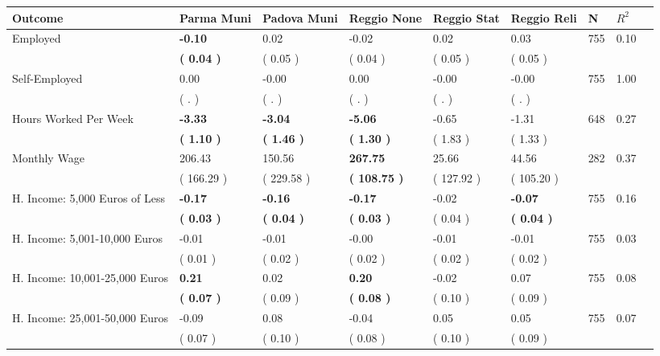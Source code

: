 \begin{tabular}{L{6.2cm} C{1.8cm} C{1.8cm} C{1.8cm} C{1.8cm} C{1.8cm} C{1.8cm} C{0.3cm} C{0.3cm}}
\toprule
 \textbf{Outcome} & \textbf{Parma Muni} & \textbf{Padova Muni} & \textbf{Reggio None} & \textbf{Reggio Stat} & \textbf{Reggio Reli} & \textbf{N} & \textbf{$ R^2$} \\
\midrule
Employed & \textbf{    -0.10} &      0.02 &     -0.02 &      0.02 &      0.03  & 755 &       0.10 \\ 
 & \textbf{(     0.04 )} & (     0.05 ) & (     0.04 ) & (     0.05 ) & (     0.05 )  & \\
Self-Employed &      0.00 &     -0.00 &      0.00 &     -0.00 &     -0.00  & 755 &       1.00 \\ 
 & (        . ) & (        . ) & (        . ) & (        . ) & (        . )  & \\
Hours Worked Per Week & \textbf{    -3.33} & \textbf{    -3.04} & \textbf{    -5.06} &     -0.65 &     -1.31  & 648 &       0.27 \\ 
 & \textbf{(     1.10 )} & \textbf{(     1.46 )} & \textbf{(     1.30 )} & (     1.83 ) & (     1.33 )  & \\
Monthly Wage &    206.43 &    150.56 & \textbf{   267.75} &     25.66 &     44.56  & 282 &       0.37 \\ 
 & (   166.29 ) & (   229.58 ) & \textbf{(   108.75 )} & (   127.92 ) & (   105.20 )  & \\
H. Income: 5,000 Euros of Less & \textbf{    -0.17} & \textbf{    -0.16} & \textbf{    -0.17} &     -0.02 & \textbf{    -0.07}  & 755 &       0.16 \\ 
 & \textbf{(     0.03 )} & \textbf{(     0.04 )} & \textbf{(     0.03 )} & (     0.04 ) & \textbf{(     0.04 )}  & \\
H. Income: 5,001-10,000 Euros &     -0.01 &     -0.01 &     -0.00 &     -0.01 &     -0.01  & 755 &       0.03 \\ 
 & (     0.01 ) & (     0.02 ) & (     0.02 ) & (     0.02 ) & (     0.02 )  & \\
H. Income: 10,001-25,000 Euros & \textbf{     0.21} &      0.02 & \textbf{     0.20} &     -0.02 &      0.07  & 755 &       0.08 \\ 
 & \textbf{(     0.07 )} & (     0.09 ) & \textbf{(     0.08 )} & (     0.10 ) & (     0.09 )  & \\
H. Income: 25,001-50,000 Euros &     -0.09 &      0.08 &     -0.04 &      0.05 &      0.05  & 755 &       0.07 \\ 
 & (     0.07 ) & (     0.10 ) & (     0.08 ) & (     0.10 ) & (     0.09 )  & \\

\end{tabular}
